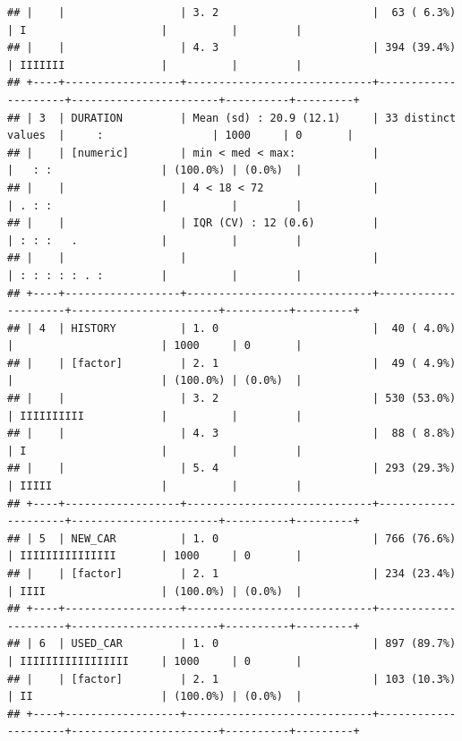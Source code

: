 \documentclass[
]{article}
\begin{document}
\begin{verbatim}
## |    |                  | 3. 2                        |  63 ( 6.3%)         | I                     |          |         |
## |    |                  | 4. 3                        | 394 (39.4%)         | IIIIIII               |          |         |
## +----+------------------+-----------------------------+---------------------+-----------------------+----------+---------+
## | 3  | DURATION         | Mean (sd) : 20.9 (12.1)     | 33 distinct values  |     :                 | 1000     | 0       |
## |    | [numeric]        | min < med < max:            |                     |   : :                 | (100.0%) | (0.0%)  |
## |    |                  | 4 < 18 < 72                 |                     | . : :                 |          |         |
## |    |                  | IQR (CV) : 12 (0.6)         |                     | : : :   .             |          |         |
## |    |                  |                             |                     | : : : : : . :         |          |         |
## +----+------------------+-----------------------------+---------------------+-----------------------+----------+---------+
## | 4  | HISTORY          | 1. 0                        |  40 ( 4.0%)         |                       | 1000     | 0       |
## |    | [factor]         | 2. 1                        |  49 ( 4.9%)         |                       | (100.0%) | (0.0%)  |
## |    |                  | 3. 2                        | 530 (53.0%)         | IIIIIIIIII            |          |         |
## |    |                  | 4. 3                        |  88 ( 8.8%)         | I                     |          |         |
## |    |                  | 5. 4                        | 293 (29.3%)         | IIIII                 |          |         |
## +----+------------------+-----------------------------+---------------------+-----------------------+----------+---------+
## | 5  | NEW_CAR          | 1. 0                        | 766 (76.6%)         | IIIIIIIIIIIIIII       | 1000     | 0       |
## |    | [factor]         | 2. 1                        | 234 (23.4%)         | IIII                  | (100.0%) | (0.0%)  |
## +----+------------------+-----------------------------+---------------------+-----------------------+----------+---------+
## | 6  | USED_CAR         | 1. 0                        | 897 (89.7%)         | IIIIIIIIIIIIIIIII     | 1000     | 0       |
## |    | [factor]         | 2. 1                        | 103 (10.3%)         | II                    | (100.0%) | (0.0%)  |
## +----+------------------+-----------------------------+---------------------+-----------------------+----------+---------+

\end{verbatim}
\end{document}
